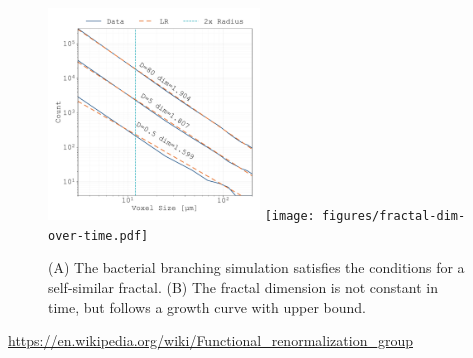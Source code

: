 \begin{figure}[h]
    \includegraphics[width=0.5\textwidth]{figures/fractal-dim-box-size-scaling.pdf}%
    \texttt{[image: figures/fractal-dim-over-time.pdf]}%
    \caption{
        (A) The bacterial branching simulation satisfies the conditions for a self-similar fractal.
        (B) The fractal dimension is not constant in time, but follows a growth curve with upper
        bound.
    }
    \label{fig:bacterial-brancing-fractal-dimension}
\end{figure}

\url{https://en.wikipedia.org/wiki/Functional_renormalization_group}

